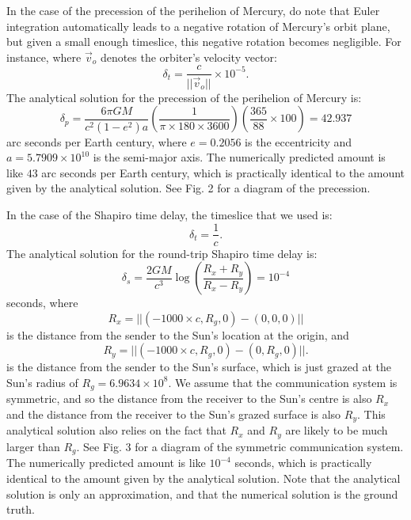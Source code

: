 \documentclass[12pt]{article}
\begin{document}
In the case of the precession of the perihelion of Mercury, do note that Euler integration automatically leads to a negative rotation of Mercury's orbit plane, but given a small enough timeslice, this negative rotation becomes negligible.
For instance, where $\vec{v}_{o}$ denotes the orbiter's velocity vector:
\begin{equation}
\label{dt_other}
\delta_{t} = \frac{c}{\lvert\lvert \vec{v}_{o} \rvert \rvert} \times 10^{-5}.
\end{equation}
The analytical solution for the precession of the perihelion of Mercury is:
\begin{equation}
\label{delta_p}
\delta_{p} = \frac{6 \pi G M}{c^2 (1 - e^2) a} \left( \frac{1}{ \pi \times 180 \times 3600} \right) \left( \frac{365}{88} \times 100 \right) = 42.937
\end{equation}
arc seconds per Earth century, where $e = 0.2056$ is the eccentricity and $a = 5.7909 \times 10^{10}$ is the semi-major axis.
The numerically predicted amount is like $43$ arc seconds per Earth century, which is practically identical to the amount given by the analytical solution.
See Fig. 2 for a diagram of the precession.




In the case of the Shapiro time delay, the timeslice that we used is:
\begin{equation}
\label{dt_1_div_c}
\delta_{t} = \frac{1}{c}.
\end{equation}
The analytical solution for the round-trip Shapiro time delay is:
\begin{equation}
\label{delta_s}
\delta_{s} = \frac{2GM}{c^3} \log\left( \frac{R_x + R_y}{R_x - R_y} \right) = 10^{-4}
\end{equation}
seconds, where 
\begin{equation}
\label{r_x}
R_x = \lvert\lvert (-1000 \times c, R_g, 0) - (0, 0, 0) \rvert\rvert
\end{equation}
is the distance from the sender to the Sun's location at the origin, and
\begin{equation}
\label{r_y}
R_y = \lvert\lvert (-1000 \times c, R_g, 0) - (0, R_g, 0) \rvert\rvert.
\end{equation}
is the distance from the sender to the Sun's surface, which is just grazed at the Sun's radius of $R_g = 6.9634 \times 10^8$.
We assume that the communication system is symmetric, and so the distance from the receiver to the Sun's centre is also $R_x$ and the distance from the receiver to the Sun's grazed surface is also $R_y$.
This analytical solution also relies on the fact that $R_x$ and $R_y$ are likely to be much larger than $R_g$.
See Fig. 3 for a diagram of the symmetric communication system.
The numerically predicted amount is like $10^{-4}$ seconds, which is practically identical to the amount given by the analytical solution.
Note that the analytical solution is only an approximation, and that the numerical solution is the ground truth.
\end{document}
